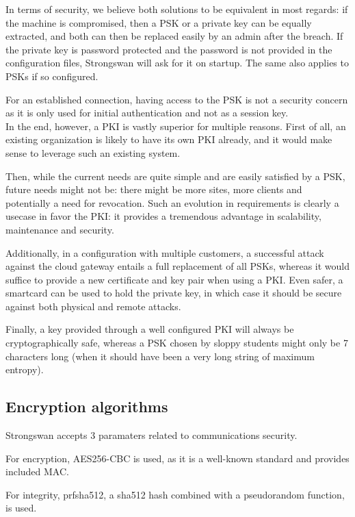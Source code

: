 \documentclass[paper=a4, fontsize=11pt]{scrartcl}
\begin{document}
In terms of security, we believe both solutions to be equivalent in most
regards: if the machine is compromised, then a PSK or a private key can be
equally extracted, and both can then be replaced easily by an admin after the
breach. 
If the private key is password protected and the password is not provided in the
configuration files, Strongswan will ask for it on startup.
The same also applies to PSKs if so configured.

For an established connection, having access to the PSK is not a security
concern as it is only used for initial authentication and not as a session key.\\

In the end, however, a PKI is vastly superior for multiple reasons.
First of all, an existing organization is likely to have its own PKI already,
and it would make sense to leverage such an existing system.

Then, while the current needs are quite simple and are easily satisfied by a
PSK, future needs might not be: there might be more sites, more clients and
potentially a need for revocation.
Such an evolution in requirements is clearly a usecase in favor the PKI\@: it
provides a tremendous advantage in scalability, maintenance and security.

Additionally, in a configuration with multiple customers, a successful attack
against the cloud gateway entails a full replacement of all PSKs, whereas it
would suffice to provide a new certificate and key pair when using a PKI\@.
Even safer, a smartcard can be used to hold the private key, in which case it
should be secure against both physical and remote attacks.

Finally, a key provided through a well configured PKI will always be
cryptographically safe, whereas a PSK chosen by sloppy students might only be 7
characters long (when it should have been a very long string of maximum
entropy).

\subsection{Encryption algorithms}

Strongswan accepts 3 paramaters related to communications security.

For encryption, AES256-CBC is used, as it is a well-known standard and provides
included MAC\@.

For integrity, prfsha512, a sha512 hash combined with a pseudorandom
function, is used.
\end{document}
